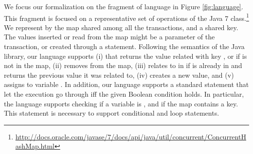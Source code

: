 We focus our formalization on the fragment of language in Figure \ref{fig:language}. This fragment is focused on a representative set  of operations of the Java 7  class.\footnote{\url{http://docs.oracle.com/javase/7/docs/api/java/util/concurrent/ConcurrentHashMap.html}} We represent by  the map shared among all the transactions, and  a shared key. The values inserted or read from the map might be a parameter of the transaction, or created through a  statement. Following the semantics of the Java library, our language supports (i)  that returns the value  related with key , or  if  is not in the map, (ii)  removes  from the map, (iii)  relates  to  in  if  is already in  and returns the previous value it was related to, (iv)  creates a new value, and (v)  assigns  to variable . In addition, our language supports a standard  statement that let the execution go through iff the given Boolean condition holds. In particular, the language supports checking if a variable is , and if the map contains a key. This statement is necessary to support conditional and loop statements.


%
%	
%
%
%


